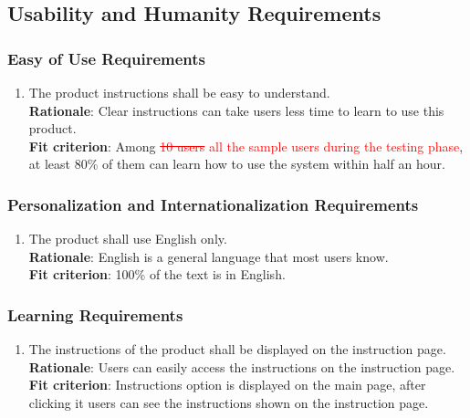 \documentclass{article}
\begin{document}
\subsection{Usability and Humanity Requirements}
\subsubsection{Easy of Use Requirements}
\begin{enumerate}[UH1.1]
    \item The product instructions shall be easy to understand.\\
    \textbf{Rationale}: Clear instructions can take users less time to learn to use this product.\\
    \textbf{Fit criterion}: Among \textcolor{red}{\st{10 users} all the sample users during the 
    testing phase}, at least 80\% of them can learn how to use the system within half an hour.
\end{enumerate}
\subsubsection{Personalization and Internationalization Requirements}
\begin{enumerate}[UH2.1]
    \item The product shall use English only.\\
    \textbf{Rationale}: English is a general language that most users know.\\
    \textbf{Fit criterion}: 100\% of the text is in English.
\end{enumerate}
\subsubsection{Learning Requirements}
\begin{enumerate}[UH3.1]
    \item The instructions of the product shall be displayed on the instruction page.\\
    \textbf{Rationale}: Users can easily access the instructions on the instruction page.\\
    \textbf{Fit criterion}: Instructions option is displayed on the main page, after clicking it users can see the instructions shown on the instruction page.
\end{enumerate}
\end{document}
